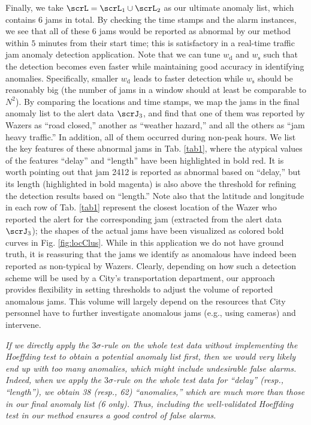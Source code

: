 \documentclass[10pt, twocolumn]{IEEEtran}
\begin{document}
Finally, we take $\scrL = \scrL_1 \cup \scrL_2$ as our ultimate anomaly
list, which contains $6$ jams in total. By checking the time stamps and
the alarm instances, we see that all of these 6 jams would be reported
as abnormal by our method within $5$ minutes from their start time; this
is satisfactory in a real-time traffic jam anomaly detection
application. Note that we can tune $w_{\text{d}}$ and $w_{\text{s}}$ such that the
detection becomes even faster while maintaining good accuracy in
identifying anomalies. Specifically, smaller $w_{\text{d}}$ leads to faster
detection while $w_{\text{s}}$ should be reasonably big (the number of jams in a
window should at least be comparable to $N^2$). By comparing the
locations and time stamps, we map the jams in the final anomaly list to
the alert data $\scrJ_3$, and find that one of them was reported by
Wazers as ``road closed,'' another as ``weather hazard,'' and all the
others as ``jam heavy traffic.''  In addition, all of them occurred
during non-peak hours. We list the key features of these abnormal jams
in Tab. \ref{tab1}, where the atypical values of the features ``delay''
and ``length'' have been highlighted in bold red. It is worth pointing out
that jam 2412 is reported as abnormal based on ``delay,'' but its length
(highlighted in bold magenta) is also above the threshold for refining the
detection results based on ``length.'' Note also that the latitude and
longitude in each row of Tab. \ref{tab1} represent the closest location
of the Wazer who reported the alert for the corresponding jam (extracted
from the alert data $\scrJ_3$); the shapes of the actual jams have been
visualized as colored bold curves in Fig. \ref{fig:locClus}. While in
this application we do not have ground truth, it is reassuring that the
jams we identify as anomalous have indeed been reported as non-typical
by Wazers. Clearly, depending on how such a detection scheme will be
used by a City's transportation department, our approach provides
flexibility in setting thresholds to adjust the volume of reported
anomalous jams. This volume will largely depend on the resources that
City personnel have to further investigate anomalous jams (e.g., using
cameras) and intervene.

\begin{rem} \label{reAnoWaze} \emph{If we directly apply the $3
    \sigma$-rule on the whole test data without implementing the
    Hoeffding test to obtain a potential anomaly list first, then we
    would very likely end up with too many anomalies, which might
    include undesirable false alarms. Indeed, when we apply the $3
    \sigma$-rule on the whole test data for ``delay'' (resp.,
    ``length''), we obtain 38 (resp., 62) ``anomalies,'' which are
    much more than those in our final anomaly list (6
    only). Thus, including the well-validated Hoeffding test in our
    method ensures a good control of false alarms.}
\end{rem}
\end{document}
